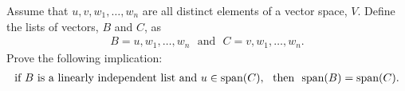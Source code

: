 \begin{question}\label{que:SpanAgain}
    \normalfont

    Assume that  $u,v,w_1,\dots,w_n$ are all distinct elements of a vector space, $V$.  Define the lists of vectors, $B$ and $C$, as
    \begin{align*}
        B =  u, w_1,\dots, w_n \ \ \ \text{and}\ \ \
        C =  v, w_1,\dots, w_n .
    \end{align*}
    Prove the following implication:
    \begin{align*}
        \text{if}\ B\ \text{is a linearly independent list and}\  u\in\textnormal{span}(C),\ \ \text{then}\ \ \textnormal{span}(B)=\textnormal{span}(C).
    \end{align*}
\end{question}

\renewcommand{\qedsymbol}{$\blacksquare$}
